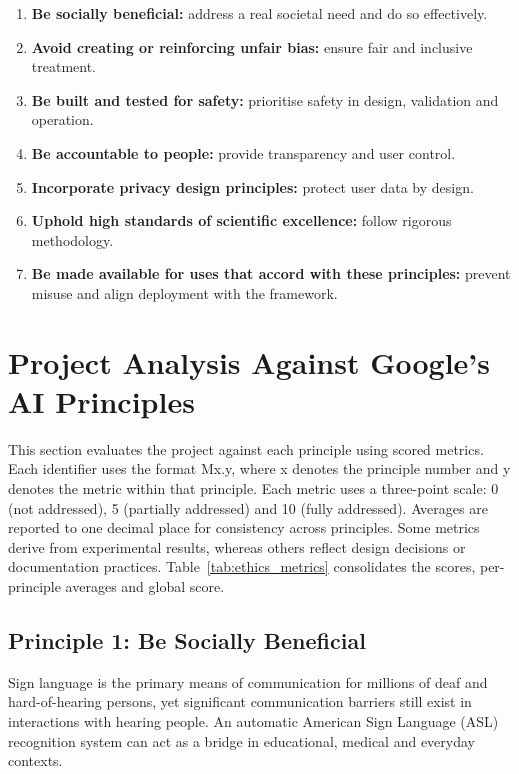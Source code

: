 \begin{enumerate}
    \item \textbf{Be socially beneficial:} address a real societal need and do so effectively.
    \item \textbf{Avoid creating or reinforcing unfair bias:} ensure fair and inclusive treatment.
    \item \textbf{Be built and tested for safety:} prioritise safety in design, validation and operation.
    \item \textbf{Be accountable to people:} provide transparency and user control.
    \item \textbf{Incorporate privacy design principles:} protect user data by design.
    \item \textbf{Uphold high standards of scientific excellence:} follow rigorous methodology.
    \item \textbf{Be made available for uses that accord with these principles:} prevent misuse and align deployment with the framework.
\end{enumerate}

\section{Project Analysis Against Google's AI Principles}
\label{sec:ethical_evaluation}

This section evaluates the project against each principle using scored metrics. Each identifier
uses the format Mx.y, where x denotes the principle number and y denotes the metric within that
principle. Each metric uses a three-point scale: 0 (not addressed), 5 (partially addressed) and 10
(fully addressed). Averages are reported to one decimal place for consistency across principles.
Some metrics derive from experimental results, whereas others reflect design decisions or
documentation practices. Table~\ref{tab:ethics_metrics} consolidates the scores, per-principle
averages and global score.

\subsection{Principle 1: Be Socially Beneficial}

Sign language is the primary means of communication for millions of deaf and hard-of-hearing
persons, yet significant communication barriers still exist in interactions with hearing people. An
automatic American Sign Language (ASL) recognition system can act as a bridge in educational,
medical and everyday contexts.

